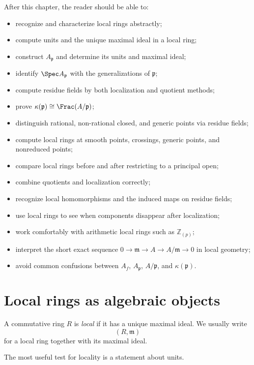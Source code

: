 After this chapter, the reader should be able to:
\begin{itemize}
\item recognize and characterize local rings abstractly;
\item compute units and the unique maximal ideal in a local ring;
\item construct $A_{\mathfrak p}$ and determine its units and maximal ideal;
\item identify $\Spec A_{\mathfrak p}$ with the generalizations of $\mathfrak p$;
\item compute residue fields by both localization and quotient methods;
\item prove $\kappa(\mathfrak p)\cong\Frac(A/\mathfrak p)$;
\item distinguish rational, non-rational closed, and generic points via residue fields;
\item compute local rings at smooth points, crossings, generic points, and nonreduced points;
\item compare local rings before and after restricting to a principal open;
\item combine quotients and localization correctly;
\item recognize local homomorphisms and the induced maps on residue fields;
\item use local rings to see when components disappear after localization;
\item work comfortably with arithmetic local rings such as $\mathbb Z_{(p)}$;
\item interpret the short exact sequence
      $0\to\mathfrak m\to A\to A/\mathfrak m\to0$ in local geometry;
\item avoid common confusions between $A_f$, $A_{\mathfrak p}$, $A/\mathfrak p$, and
      $\kappa(\mathfrak p)$.
\end{itemize}

\section{Local rings as algebraic objects}

\begin{definition}
A commutative ring $R$ is \emph{local} if it has a unique maximal ideal.  We usually write
\[
(R,\mathfrak m)
\]
for a local ring together with its maximal ideal.
\end{definition}

The most useful test for locality is a statement about units.

